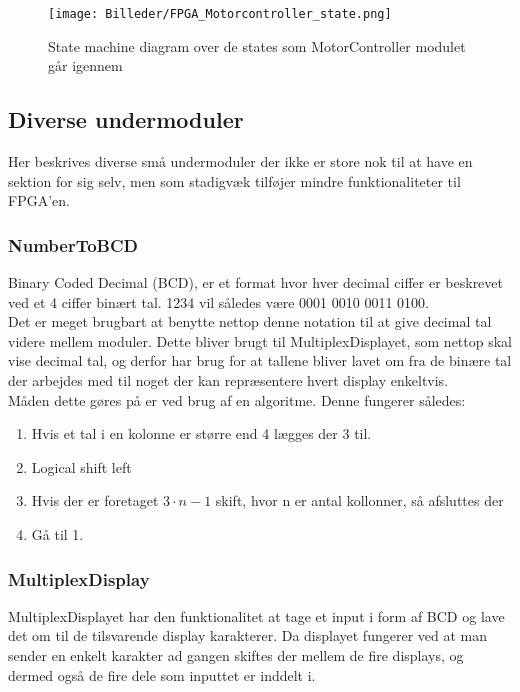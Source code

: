 \begin{figure}[ht]
	\begin{center}
		\texttt{[image: Billeder/FPGA\_Motorcontroller\_state.png]}
	\end{center}
\caption{State machine diagram over de states som MotorController modulet går igennem}
\label{fig:FPGA_MotorController_State}
\end{figure}

\subsection{Diverse undermoduler}
Her beskrives diverse små undermoduler der ikke er store nok til at have en sektion for sig selv, men som stadigvæk tilføjer mindre funktionaliteter til FPGA'en.

\subsubsection{NumberToBCD}

Binary Coded Decimal (BCD), er et format hvor hver decimal ciffer er beskrevet ved et 4 ciffer binært tal. 1234 vil således være 0001 0010 0011 0100.
\\
Det er meget brugbart at benytte nettop denne notation til at give decimal tal videre mellem moduler. Dette bliver brugt til MultiplexDisplayet, som nettop skal vise decimal tal, og derfor har brug for at tallene bliver lavet om fra de binære tal der arbejdes med til noget der kan repræsentere hvert display enkeltvis.
\\
Måden dette gøres på er ved brug af en algoritme. Denne fungerer således:

\begin{enumerate}[noitemsep]
\item Hvis et tal i en kolonne er større end 4 lægges der 3 til.
\item Logical shift left
\item Hvis der er foretaget $3 \cdot n - 1$ skift, hvor n er antal kollonner, så afsluttes der
\item Gå til 1.
\end{enumerate}

\subsubsection{MultiplexDisplay}

MultiplexDisplayet har den funktionalitet at tage et input i form af BCD og lave det om til de tilsvarende display karakterer. Da displayet fungerer ved at man sender en enkelt karakter ad gangen skiftes der mellem de fire displays, og dermed også de fire dele som inputtet er inddelt i.

